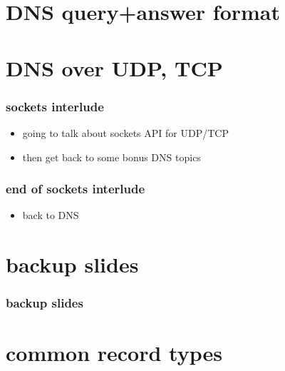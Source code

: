 \section{DNS query+answer format}


\section{DNS over UDP, TCP}


\begin{frame}
\frametitle{sockets interlude}
    \begin{itemize}
    \item going to talk about sockets API for UDP/TCP
    \item then get back to some bonus DNS topics
    \end{itemize}
\end{frame}



\begin{frame}
\frametitle{end of sockets interlude}
    \begin{itemize}
        \item back to DNS
    \end{itemize}
\end{frame}



\section{backup slides}
\begin{frame}\frametitle{backup slides}
\end{frame}
\section{common record types}



